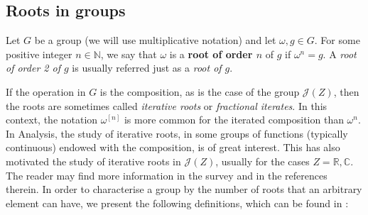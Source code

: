 \documentclass[preprint,12pt]{elsarticle}
\begin{document}











\subsection{Roots in groups}



Let $G$ be a group (we will use multiplicative notation) and let $\omega,g\in G$. For some positive integer $n\in\mathbb N$, we say that $\omega$ is a \textbf{root of order $n$} of $g$ if $\omega^n=g$. A \emph{root of order 2 of $g$} is usually referred just as a \emph{root of $g$}.


\medskip

If the operation in $G$ is the composition, as is the case of the group $\mathcal J(Z)$, then the roots are sometimes called \emph{iterative roots} or \emph{fractional iterates}. In this context, the notation $\omega^{[n]}$ is more common for the iterated composition than $\omega^n$. In Analysis, the study of iterative roots, in some groups of functions (typically continuous) endowed with the composition, is of great interest. This has also motivated the study of iterative roots in $\mathcal J(Z)$, usually for the cases $Z=\mathbb R,\mathbb C$. The reader may find more information in the survey \cite{Ja} and in the references therein. In order to characterise a group by the number of roots that an arbitrary element can have, we present the following definitions, which can be found in  \cite{B}:

\end{document}

